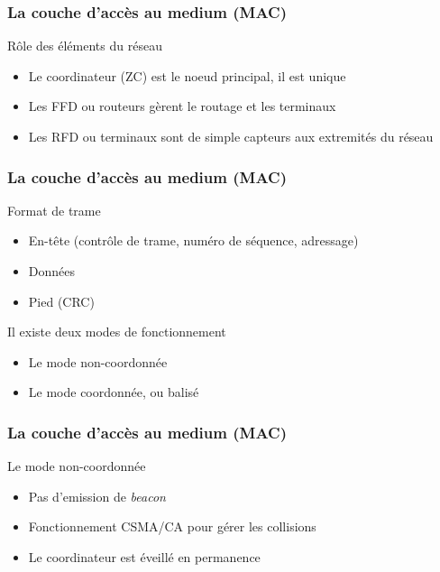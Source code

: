 \documentclass{beamer}
\begin{document}
  \begin{frame}
    \frametitle{La couche d'accès au medium (MAC)}
    \begin{block}{Rôle des éléments du réseau}
      \begin{itemize}
        \item Le coordinateur (ZC) est le noeud principal, il est unique
        \item Les FFD ou routeurs gèrent le routage et les terminaux
        \item Les RFD ou terminaux sont de simple capteurs aux extremités du réseau
      \end{itemize}
    \end{block}
  \end{frame}
  
  \begin{frame}
    \frametitle{La couche d'accès au medium (MAC)}
    \begin{block}{Format de trame}
      \begin{itemize}
        \item En-tête (contrôle de trame, numéro de séquence, adressage)
        \item Données
        \item Pied (CRC)
      \end{itemize}
    \end{block}
    \begin{block}{Il existe deux modes de fonctionnement}
      \begin{itemize}
        \item Le mode non-coordonnée
        \item Le mode coordonnée, ou balisé
      \end{itemize}
    \end{block}
  \end{frame}
  
  \begin{frame}
    \frametitle{La couche d'accès au medium (MAC)}
    \begin{block}{Le mode non-coordonnée}
      \begin{itemize}
        \item Pas d'emission de \textit{beacon}
        \item Fonctionnement CSMA/CA pour gérer les collisions
        \item Le coordinateur est éveillé en permanence
      \end{itemize}
    \end{block}
  \end{frame}
\end{document}
